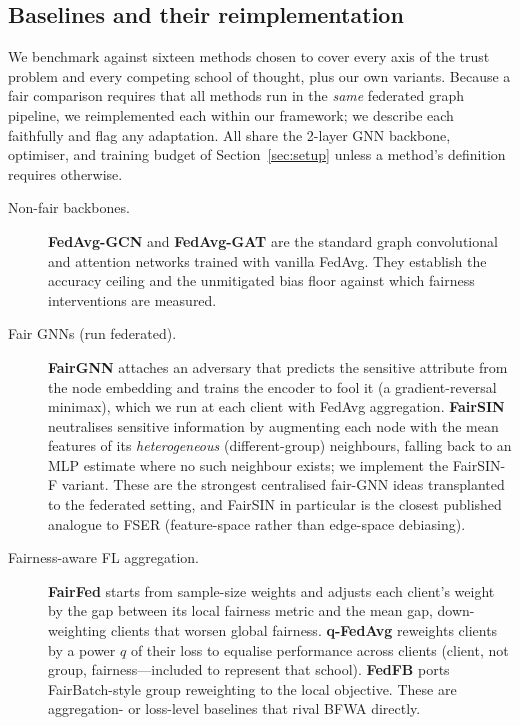 \documentclass[pdflatex,sn-mathphys-num]{sn-jnl}
\theoremstyle{thmstyleone}%
\theoremstyle{thmstyletwo}%
\theoremstyle{thmstylethree}%
\begin{document}
\subsection{Baselines and their reimplementation}
\label{sec:baselines}
We benchmark against sixteen methods chosen to cover every axis of the trust
problem and every competing school of thought, plus our own variants. Because a
fair comparison requires that all methods run in the \emph{same} federated
graph pipeline, we reimplemented each within our framework; we describe each
faithfully and flag any adaptation. All share the 2-layer GNN backbone,
optimiser, and training budget of Section~\ref{sec:setup} unless a method's
definition requires otherwise.

\begin{description}
\item[Non-fair backbones.] \textbf{FedAvg-GCN} and \textbf{FedAvg-GAT}
\cite{kipf2016semi,velickovic2017graph,mcmahan2017communication} are the
standard graph convolutional and attention networks trained with vanilla FedAvg.
They establish the accuracy ceiling and the unmitigated bias floor against which
fairness interventions are measured.

\item[Fair GNNs (run federated).] \textbf{FairGNN} \cite{dai2021say} attaches an
adversary that predicts the sensitive attribute from the node embedding and
trains the encoder to fool it (a gradient-reversal minimax), which we run at each
client with FedAvg aggregation. \textbf{FairSIN} \cite{yang2024fairsin}
neutralises sensitive information by augmenting each node with the mean features
of its \emph{heterogeneous} (different-group) neighbours, falling back to an MLP
estimate where no such neighbour exists; we implement the FairSIN-F variant.
These are the strongest centralised fair-GNN ideas transplanted to the federated
setting, and FairSIN in particular is the closest published analogue to FSER
(feature-space rather than edge-space debiasing).

\item[Fairness-aware FL aggregation.] \textbf{FairFed} \cite{ezzeldin2023fairfed}
starts from sample-size weights and adjusts each client's weight by the gap
between its local fairness metric and the mean gap, down-weighting clients that
worsen global fairness. \textbf{q-FedAvg} \cite{li2020fair} reweights clients by
a power $q$ of their loss to equalise performance across clients (client, not
group, fairness---included to represent that school). \textbf{FedFB} ports
FairBatch-style group reweighting to the local objective. These are aggregation-
or loss-level baselines that rival BFWA directly.


\end{description}
\end{document}
